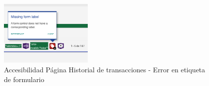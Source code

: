 \begin{figure}[H]
    \centering
    \includegraphics[width=0.4\textwidth]{figures/accesibilidad/A-acc-error-transacciones.png}
    \caption{Accesibilidad Página Historial de transacciones - Error en etiqueta de formulario}
    \label{fig:Acc-Transacciones-errror}
\end{figure}


